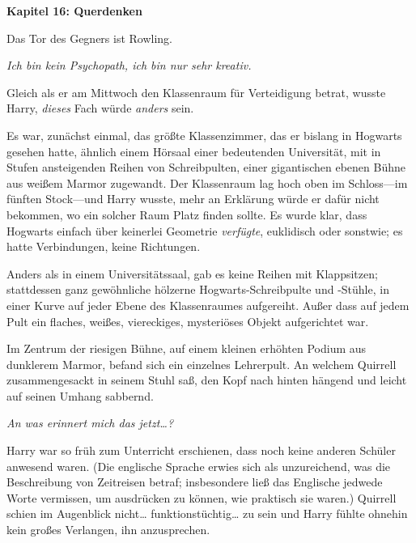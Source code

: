 

\hypertarget{querdenken}{%

\textbf{Kapitel 16: Querdenken}

Das Tor des Gegners ist Rowling.

\later

\emph{Ich bin kein Psychopath, ich bin nur sehr kreativ.}

\later

Gleich als er am Mittwoch den Klassenraum für Verteidigung betrat, wusste Harry, \emph{dieses} Fach würde \emph{anders} sein.

Es war, zunächst einmal, das größte Klassenzimmer, das er bislang in Hogwarts gesehen hatte, ähnlich einem Hörsaal einer bedeutenden Universität, mit in Stufen ansteigenden Reihen von Schreibpulten, einer gigantischen ebenen Bühne aus weißem Marmor zugewandt. Der Klassenraum lag hoch oben im Schloss—im fünften Stock—und Harry wusste, mehr an Erklärung würde er dafür nicht bekommen, wo ein solcher Raum Platz finden sollte. Es wurde klar, dass Hogwarts einfach über keinerlei Geometrie \emph{verfügte}, euklidisch oder sonstwie; es hatte Verbindungen, keine Richtungen.

Anders als in einem Universitätssaal, gab es keine Reihen mit Klappsitzen; stattdessen ganz gewöhnliche hölzerne Hogwarts-Schreibpulte und -Stühle, in einer Kurve auf jeder Ebene des Klassenraumes aufgereiht. Außer dass auf jedem Pult ein flaches, weißes, viereckiges, mysteriöses Objekt aufgerichtet war.

Im Zentrum der riesigen Bühne, auf einem kleinen erhöhten Podium aus dunklerem Marmor, befand sich ein einzelnes Lehrerpult. An welchem Quirrell zusammengesackt in seinem Stuhl saß, den Kopf nach hinten hängend und leicht auf seinen Umhang sabbernd.

\emph{An was erinnert mich das jetzt…?}

Harry war so früh zum Unterricht erschienen, dass noch keine anderen Schüler anwesend waren. (Die englische Sprache erwies sich als unzureichend, was die Beschreibung von Zeitreisen betraf; insbesondere ließ das Englische jedwede Worte vermissen, um ausdrücken zu können, wie praktisch sie waren.) Quirrell schien im Augenblick nicht… funktionstüchtig… zu sein und Harry fühlte ohnehin kein großes Verlangen, ihn anzusprechen.

}
